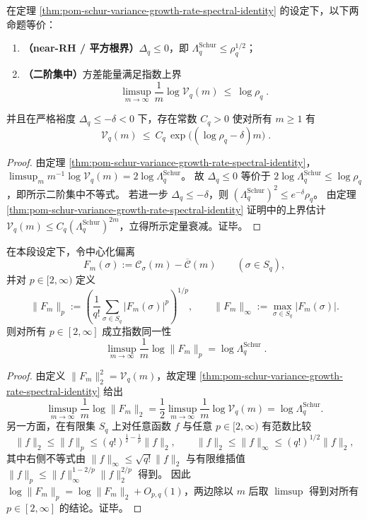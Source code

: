 \begin{corollary}[平方根门槛的纯方差判别]\label{cor:pom-schur-near-rh-variance-concentration}
在定理 \ref{thm:pom-schur-variance-growth-rate-spectral-identity} 的设定下，以下两命题等价：
\begin{enumerate}
  \item \textbf{（near-RH / 平方根界）}\(\Delta_q\le 0\)，即 \(\Lambda_q^{\mathrm{Schur}}\le \rho_q^{1/2}\)；
  \item \textbf{（二阶集中）}方差能量满足指数上界
  \[
  \boxed{\;
  \limsup_{m\to\infty}\frac{1}{m}\log \mathcal V_q(m)\ \le\ \log\rho_q\; }.
  \]
\end{enumerate}
并且在严格裕度 \(\Delta_q\le-\delta<0\) 下，存在常数 \(C_q>0\) 使对所有 \(m\ge 1\) 有
\[
\boxed{\;
\mathcal V_q(m)\ \le\ C_q\,\exp\!\bigl((\log\rho_q-\delta)m\bigr)\; } .
\]
\end{corollary}
\begin{proof}
由定理 \ref{thm:pom-schur-variance-growth-rate-spectral-identity}，
\(
\limsup_m m^{-1}\log\mathcal V_q(m)=2\log\Lambda_q^{\mathrm{Schur}}
\)。
故 \(\Delta_q\le 0\) 等价于 \(2\log\Lambda_q^{\mathrm{Schur}}\le \log\rho_q\)，即所示二阶集中不等式。
若进一步 \(\Delta_q\le-\delta\)，则 \((\Lambda_q^{\mathrm{Schur}})^{2}\le e^{-\delta}\rho_q\)。
由定理 \ref{thm:pom-schur-variance-growth-rate-spectral-identity} 证明中的上界估计
\(\mathcal V_q(m)\le C_q(\Lambda_q^{\mathrm{Schur}})^{2m}\)，立得所示定量衰减。证毕。
\end{proof}

\begin{theorem}\label{thm:pom-schur-envelope-lp-exponent-identity}
在本段设定下，令中心化偏离
\[
F_m(\sigma):=\mathcal{C}_\sigma(m)-\overline{\mathcal C}(m)\qquad(\sigma\in S_q),
\]
并对 \(p\in[2,\infty)\) 定义
\[
\|F_m\|_p:=\left(\frac{1}{q!}\sum_{\sigma\in S_q}|F_m(\sigma)|^p\right)^{1/p},
\qquad
\|F_m\|_\infty:=\max_{\sigma\in S_q}|F_m(\sigma)|.
\]
则对所有 \(p\in[2,\infty]\) 成立指数同一性
\[
\boxed{\;
\limsup_{m\to\infty}\frac{1}{m}\log \|F_m\|_p
=\log \Lambda_q^{\mathrm{Schur}}\; } .
\]
\end{theorem}
\begin{proof}
由定义 \(\|F_m\|_2^2=\mathcal V_q(m)\)，故定理 \ref{thm:pom-schur-variance-growth-rate-spectral-identity} 给出
\[
\limsup_{m\to\infty}\frac{1}{m}\log\|F_m\|_2
=\frac12\limsup_{m\to\infty}\frac{1}{m}\log\mathcal V_q(m)
=\log\Lambda_q^{\mathrm{Schur}}.
\]
另一方面，在有限集 \(S_q\) 上对任意函数 \(f\) 与任意 \(p\in[2,\infty)\) 有范数比较
\[
\|f\|_2\le \|f\|_p\le (q!)^{\frac12-\frac1p}\|f\|_2,
\qquad
\|f\|_2\le \|f\|_\infty\le (q!)^{1/2}\|f\|_2,
\]
其中右侧不等式由 \(\|f\|_\infty\le \sqrt{q!}\|f\|_2\) 与有限维插值 \(\|f\|_p\le \|f\|_\infty^{1-2/p}\|f\|_2^{2/p}\) 得到。
因此 \(\log\|F_m\|_p=\log\|F_m\|_2+O_{p,q}(1)\)，两边除以 \(m\) 后取 \(\limsup\) 得到对所有 \(p\in[2,\infty]\) 的结论。证毕。
\end{proof}

